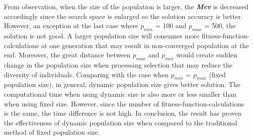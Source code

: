 \documentclass[final]{elsarticle}
\begin{document}
From observation, when the size of the population is larger, the \textit{\textbf{Mev}} is decreased accordingly since the search space is enlarged so the solution accuracy is better. However, an exception at the last case where $p_{min}$ = 100 and $p_{max}$ = 500, the solution is not good. A larger population size will consumes more fitness-function-calculations at one generation that may result in non-converged population at the end. Moreover, the great distance between \textbf{$p_{max}$} and $p_{min}$ would create sudden change in the population size when processing selection that may reduce the diversity of individuals. Comparing with the case when $p_{min} $ = $ p_{max} $ (fixed population size), in general, dynamic population size gives better solution. The computational time when using dynamic size is also more or less smaller than when using fixed size. However, since the number of fitness-function-calculations is the same, the time difference is not high. In conclusion, the result has proven the effectiveness of dynamic population size when compared to the traditional method of fixed population size. 
%
\end{document}
